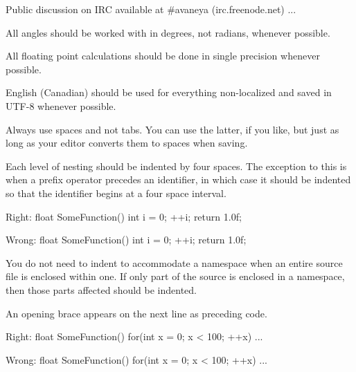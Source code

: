     Public discussion on IRC available at #avaneya (irc.freenode.net)
    ...
\stoptyping
\stopCodeExample


\startitemize[3]
\setupwhitespace[big]
\item
All angles should be worked with in degrees, not radians, whenever possible.

\item
All floating point calculations should be done in single precision whenever possible.
\stopitemize


\startitemize[3]
\setupwhitespace[big]
\item
English (Canadian) should be used for everything non-localized and saved in UTF-8 whenever possible.

\item
Always use spaces and not tabs. You can use the latter, if you like, but just as long as your editor converts them to spaces when saving.

\item
Each level of nesting should be indented by four spaces. The exception to this is when a prefix operator precedes an identifier, in which case it should be indented so that the identifier begins at a four space interval.

Right:
\startCodeExample
\starttyping
float SomeFunction()
{
    int i = 0;
  ++i;
    return 1.0f;
}
\stoptyping
\stopCodeExample

Wrong:
\startCodeExample
\starttyping
float SomeFunction()
{
    int i = 0;
    ++i;
        return 1.0f;
}
\stoptyping
\stopCodeExample

\item
You do not need to indent to accommodate a namespace when an entire source file is enclosed within one. If only part of the source is enclosed in a namespace, then those parts affected should be indented.

\item
An opening brace appears on the next line as preceding code.

Right:
\startCodeExample
\starttyping
float SomeFunction()
{
    for(int x = 0; x < 100; ++x)
    {
        ...
    }
}
\stoptyping
\stopCodeExample

Wrong:
\startCodeExample
\starttyping
float SomeFunction() {
    for(int x = 0; x < 100; ++x) {
        ...
    }
}
\stoptyping
\stopCodeExample

